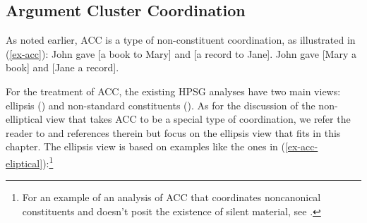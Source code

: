 {\iffalse{
To illustrate, an English verb form mismatch is depicted in (\ref{verbform}), from \citep[see][5]{Shiraishi2019}, where the left conjunct requires a participle while the shared material contains an infinitive form of the verb \textit{appear}.

\ea Some new hybrid models already have, and others soon will appear in the automobile industry.\label{verbform}

\citep{Shiraishi2019} capture verb form mismatch of this kind by introducing into their analysis of RNR the feature LID, which carries lexeme identity information. That is, this feature ensures semantic and syntactic category identity but ignores differences introduced by inflectional suffixes, with the result that the participle and the infinitive in (\ref{verbform}) count as lexeme-identical. RNR is licensed by including the LID feature in the MP feature also used in \citet{Chaves2014} (see (\ref{bpd})).
}\fi


\subsection{Argument Cluster Coordination}

As noted earlier, ACC is a type of non-constituent coordination, as
illustrated in (\ref{ex-acc}):
%
%
\eal
\label{ex-acc}
\ex John gave [a book to Mary] and [a record to Jane].   \label{acc-here}
\ex John gave [Mary a book] and [Jane a record].  \label{acc-1}
\zl
%
%

For the treatment of ACC, the existing HPSG analyses have two main views: ellipsis
(\citealt{Yatabe2001, Crysmann2003, Beavers2004}) and
non-standard constituents (\citealt{Mouret2006}). As for the discussion of
the non-elliptical view that takes ACC to be a special type of coordination,
we refer the reader to  and references 
therein but focus on the ellipsis view that fits in this chapter. 
 The ellipsis view is based on examples like the ones in (\ref{ex-acc-eliptical}):\footnote{For an example of an analysis of ACC that coordinates noncanonical constituents and doesn't posit the existence of silent material, see \citep{Mouret2006}.}

}

